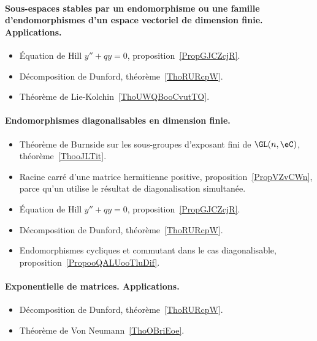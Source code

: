 \paragraph{Sous-espaces stables par un endomorphisme ou une famille d’endomorphismes d’un espace vectoriel de dimension finie. Applications.}
\begin{itemize}
    \item Équation de Hill \( y''+qy=0\), proposition~\ref{PropGJCZcjR}.
    \item Décomposition de Dunford, théorème~\ref{ThoRURcpW}.
    \item Théorème de Lie-Kolchin~\ref{ThoUWQBooCvutTO}.
\end{itemize}
\paragraph{Endomorphismes diagonalisables en dimension finie.}
\begin{itemize}
    \item Théorème de Burnside sur les sous-groupes d'exposant fini de \( \GL(n,\eC)\), théorème~\ref{ThooJLTit}.
    \item Racine carré d'une matrice hermitienne positive, proposition~\ref{PropVZvCWn}, parce qu'un utilise le résultat de diagonalisation simultanée.
    \item Équation de Hill \( y''+qy=0\), proposition~\ref{PropGJCZcjR}.
    \item Décomposition de Dunford, théorème~\ref{ThoRURcpW}.
    \item Endomorphismes cycliques et commutant dans le cas diagonalisable, proposition~\ref{PropooQALUooTluDif}.
\end{itemize}
\paragraph{Exponentielle de matrices. Applications.}
\begin{itemize}
    \item Décomposition de Dunford, théorème~\ref{ThoRURcpW}.
    \item Théorème de Von Neumann~\ref{ThoOBriEoe}.
\end{itemize}
